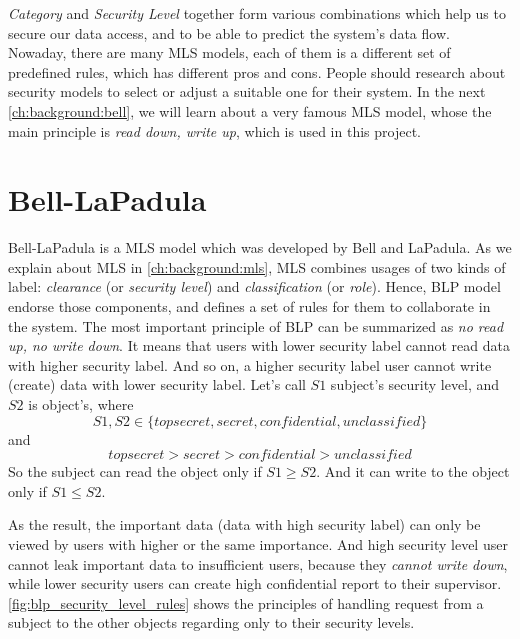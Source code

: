 \emph{Category} and \emph{Security Level} together form various combinations which help us to secure our data access, and to be able to predict the system's data flow.
Nowaday, there are many MLS models, each of them is a different set of predefined rules, which has different pros and cons.
People should research about security models to select or adjust a suitable one for their system. In the next \autoref{ch:background:bell}, we will learn about a very famous MLS model, whose the main principle is \emph{read down, write up}, which is used in this project.


\section{Bell-LaPadula}
\label{ch:background:bell}

Bell-LaPadula is a MLS model which was developed by Bell and LaPadula.
As we explain about MLS in \autoref{ch:background:mls}, MLS combines usages of two kinds of label: \emph{clearance} (or \emph{security level}) and \emph{classification} (or \emph{role}).
Hence, BLP model endorse those components, and defines a set of rules for them to collaborate in the system.
The most important principle of BLP can be summarized as \emph{no read up, no write down}.
It means that users with lower security label cannot read data with higher security label.
And so on, a higher security label user cannot write (create) data with lower security label.
Let's call $S1$ subject's security level, and $S2$ is object's, where 
$$S1,S2 \in \{top secret, secret, confidential, unclassified\}$$ 
and 
$$top secret > secret > confidential > unclassified$$
So the subject can read the object only if $S1 \geq S2$.
And it can write to the object only if $S1 \leq S2$.

As the result, the important data (data with high security label) can only be viewed by users with higher or the same importance.
And high security level user cannot leak important data to insufficient users, because they \emph{cannot write down}, while lower security users can create high confidential report to their supervisor. 
\autoref{fig:blp_security_level_rules} shows the principles of handling request from a subject to the other objects regarding only to their security levels.

